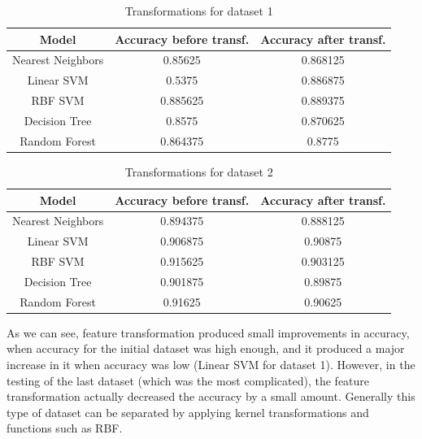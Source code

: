 \documentclass[conference]{IEEEtran}
\begin{document}
\begin{table}[hbt!]
	\caption{Transformations for dataset 1}
	\begin{center}
		\begin{tabular}{|c|c|c|}
			\hline
			\textbf{Model}&\textbf{Accuracy before transf.}&\textbf{Accuracy after transf.} \\
			\hline
			Nearest Neighbors&0.85625&0.868125 \\
			\hline
			Linear SVM&0.5375&0.886875 \\
			\hline
			RBF SVM&0.885625&0.889375 \\
			\hline
			Decision Tree&0.8575&0.870625 \\
			\hline
			Random Forest&0.864375&0.8775 \\
			\hline
		\end{tabular}
		\label{tab4}
	\end{center}
\end{table}

\begin{table}[hbt!]
	\caption{Transformations for dataset 2}
	\begin{center}
		\begin{tabular}{|c|c|c|}
			\hline
			\textbf{Model}&\textbf{Accuracy before transf.}&\textbf{Accuracy after transf.} \\
			\hline
			Nearest Neighbors&0.894375&0.888125 \\
			\hline
			Linear SVM&0.906875&0.90875 \\
			\hline
			RBF SVM&0.915625&0.903125 \\
			\hline
			Decision Tree&0.901875&0.89875 \\
			\hline
			Random Forest&0.91625&0.90625 \\
			\hline
		\end{tabular}
		\label{tab4}
	\end{center}
\end{table}

As we can see, feature transformation produced small improvements in accuracy, when accuracy for the initial dataset was high enough, and it produced a major increase in it when accuracy was low (Linear SVM for dataset 1). However, in the testing of the last dataset (which was the most complicated), the feature transformation actually decreased the accuracy by a small amount. Generally this type of dataset can be separated by applying kernel transformations and functions such as RBF. \\
\end{document}
